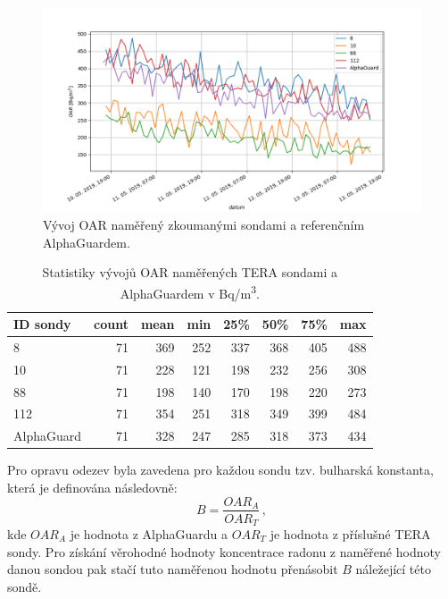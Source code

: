 \begin{figure}[H]
	\centering
	\includegraphics[width=1\linewidth]{images/sondy_srovnani}
	\caption{Vývoj OAR naměřený zkoumanými sondami a referenčním AlphaGuardem.}
	\label{fig:dynMer_sondySrovnani}
\end{figure}
\begin{table}[ht]
	\centering
	\caption{Statistiky vývojů OAR naměřených TERA sondami a AlphaGuardem v \si{Bq/m^3}.}
	\label{tab:dynMer_sondy}
	\begin{tabular}{lrrrrrrr}
		\toprule
		ID sondy &  count &  mean    &  min &  25\% &  50\% &  75\% &  max \\
		\midrule
		8          &     71 &   369  &  252 &  337 &  368 &  405 &  488 \\
		10         &     71 &   228  &  121 &  198 &  232 &  256 &  308 \\
		88         &     71 &   198  &  140 &  170 &  198 &  220 &  273 \\
		112        &     71 &   354  &  251 &  318 &  349 &  399 &  484 \\
		\midrule
		AlphaGuard &     71 &   328  &  247 &  285 &  318 &  373 &  434 \\
		\bottomrule
	\end{tabular}
      
      
\end{table}

Pro opravu odezev byla zavedena pro každou sondu tzv. bulharská konstanta, která je definována následovně:
\begin{equation}
	B=\frac{OAR_A}{OAR_T}\,,
\end{equation}
kde $OAR_A$ je hodnota z AlphaGuardu a $OAR_T$ je hodnota z příslušné TERA sondy. Pro získání věrohodné hodnoty koncentrace radonu z naměřené hodnoty danou sondou pak stačí tuto naměřenou hodnotu přenásobit $B$ náležející této sondě.


